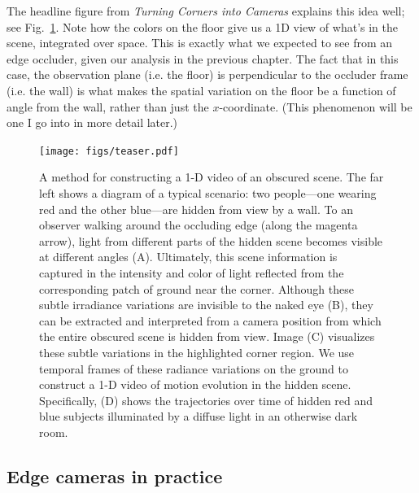 The headline figure from \emph{Turning Corners into Cameras} explains this idea well; see Fig.~\ref{fig:teaser}. Note how the colors on the floor give us a 1D view of what's in the scene, integrated over space. This is exactly what we expected to see from an edge occluder, given our analysis in the previous chapter. The fact that in this case, the observation plane (i.e. the floor) is perpendicular to the occluder frame (i.e. the wall) is what makes the spatial variation on the floor be a function of angle from the wall, rather than just the $x$-coordinate. (This phenomenon will be one I go into in more detail later.)

\begin{figure}
\begin{center}
\texttt{[image: figs/teaser.pdf]}
\caption{A method for constructing a 1-D video of an obscured scene. The far left shows a diagram of a typical scenario: two people---one wearing red and the other blue---are hidden from view by a wall. To an observer walking around the occluding edge (along the magenta arrow), light from different parts of the hidden scene becomes visible at different angles (A). Ultimately, this scene information is captured in the intensity and color of light reflected from the corresponding patch of ground near the corner. Although these subtle irradiance variations are invisible to the naked eye (B), they can be extracted and interpreted from a camera position from which the entire obscured scene is hidden from view. Image (C) visualizes these subtle variations in the highlighted corner region. We use temporal frames of these radiance variations on the ground to construct a 1-D video of motion evolution in the hidden scene. Specifically, (D) shows the trajectories over time of hidden red and blue subjects illuminated by a diffuse light in an otherwise dark room. \label{fig:teaser}}
\end{center}
\end{figure}

\subsection{Edge cameras in practice}

\newcommand{\yt}{\mathbf{y}^{(t)}}
\newcommand{\xt}{\mathbf{x}^{(t)}}
\newcommand{\diff}{\mathrm{d}}
\makeatletter   
\newcommand{\Spvek}[2][r]{%
	\gdef\@VORNE{1}
	\left(\hskip-\arraycolsep%
	\begin{array}{#1}\vekSp@lten{#2}\end{array}%
	\hskip-\arraycolsep\right)}


